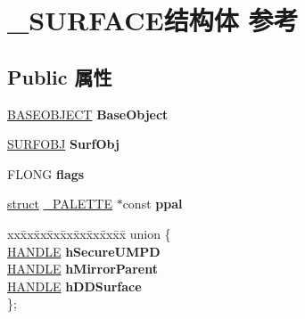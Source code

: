 \hypertarget{struct___s_u_r_f_a_c_e}{}\section{\+\_\+\+S\+U\+R\+F\+A\+C\+E结构体 参考}
\label{struct___s_u_r_f_a_c_e}
\subsection*{Public 属性}
\begin{DoxyCompactItemize}
\item 
\mbox{\label{struct___s_u_r_f_a_c_e_adb8e3fb35fd51ede8f98f6450de798c3}} 
\hyperlink{class_b_a_s_e_o_b_j_e_c_t}{B\+A\+S\+E\+O\+B\+J\+E\+CT} {\bfseries Base\+Object}
\item 
\mbox{\label{struct___s_u_r_f_a_c_e_a1f743ab2bd8a1d3d1da2b21227a653bd}} 
\hyperlink{struct___s_u_r_f_o_b_j}{S\+U\+R\+F\+O\+BJ} {\bfseries Surf\+Obj}
\item 
\mbox{\label{struct___s_u_r_f_a_c_e_af70c91519350458314633ca70673f15b}} 
F\+L\+O\+NG {\bfseries flags}
\item 
\mbox{\label{struct___s_u_r_f_a_c_e_ad86166f612114ca26defd642375e9c3f}} 
\hyperlink{interfacestruct}{struct} \hyperlink{struct___p_a_l_e_t_t_e}{\+\_\+\+P\+A\+L\+E\+T\+TE} $\ast$const {\bfseries ppal}
\item 
\mbox{\label{struct___s_u_r_f_a_c_e_a3fc97a907ede675b6a4a3456ebe367bd}} 
\begin{tabbing}
xx\=xx\=xx\=xx\=xx\=xx\=xx\=xx\=xx\=\kill
union \{\\
\>\hyperlink{interfacevoid}{HANDLE} {\bfseries hSecureUMPD}\\
\>\hyperlink{interfacevoid}{HANDLE} {\bfseries hMirrorParent}\\
\>\hyperlink{interfacevoid}{HANDLE} {\bfseries hDDSurface}\\
\}; \\


\end{tabbing}
\end{DoxyCompactItemize}
